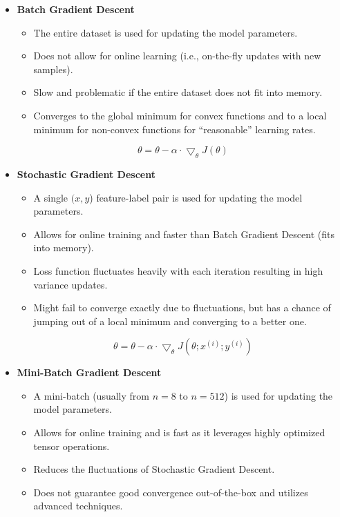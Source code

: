 \documentclass[11pt]{article}
\begin{document}
\begin{itemize}
    \item \textbf{Batch Gradient Descent}
        \begin{itemize}
            \item The entire dataset is used for updating the model parameters.
            \item Does not allow for online learning (i.e., on-the-fly updates with new samples).
            \item Slow and problematic if the entire dataset does not fit into memory.
            \item Converges to the global minimum for convex functions and to a local minimum for
                non-convex functions for ``reasonable'' learning rates.
        \end{itemize}

        \begin{equation}
            \theta = \theta - \alpha \cdot \bigtriangledown_\theta J(\theta)
        \end{equation}

    \item \textbf{Stochastic Gradient Descent}
        \begin{itemize}
            \item A single \((x, y\)) feature-label pair is used for updating the model parameters.
            \item Allows for online training and faster than Batch Gradient Descent (fits into memory).
            \item Loss function fluctuates heavily with each iteration resulting in high variance updates.
            \item Might fail to converge exactly due to fluctuations, but has a chance of jumping
                out of a local minimum and converging to a better one.
        \end{itemize}

        \begin{equation}
            \theta = \theta - \alpha \cdot \bigtriangledown_\theta J(\theta;{x^{(i)}};{y^{(i)}})
        \end{equation}

    \item \textbf{Mini-Batch Gradient Descent}
        \begin{itemize}
            \item A mini-batch (usually from \(n = 8\) to \(n = 512\)) is used for updating the model parameters.
            \item Allows for online training and is fast as it leverages highly optimized tensor operations.
            \item Reduces the fluctuations of Stochastic Gradient Descent.
            \item Does not guarantee good convergence out-of-the-box and utilizes advanced techniques.
        \end{itemize}


\end{itemize}
\end{document}
